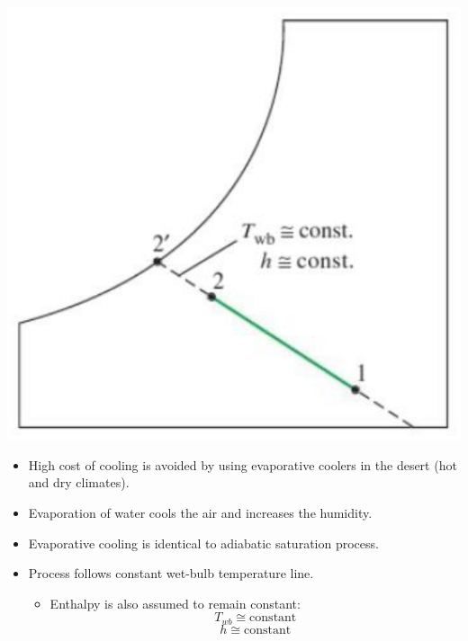 \documentclass[11pt]{article}
\begin{document}
\begin{center}
\includegraphics[scale=0.8]{./images/evaporative-cooling-psychrometric-chart.png}
\end{center}
\begin{itemize}
\item High cost of cooling is avoided by using evaporative coolers in the desert (hot and dry climates).
\item Evaporation of water cools the air and increases the humidity.
\item Evaporative cooling is identical to adiabatic saturation process.
\item Process follows constant wet-bulb temperature line.
\begin{itemize}
\item Enthalpy is also assumed to remain constant:
\[T_{wb} \cong \text{constant}\]
\[h \cong \text{constant}\]
\end{itemize}
\end{itemize}
\end{document}
